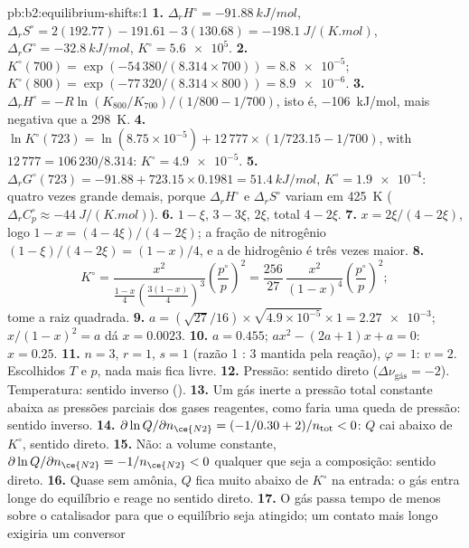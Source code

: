 \begin{solution}{pb:b2:equilibrium-shifts:1}
\textbf{1.} $\Delta_r H^\circ = \qty{-91.88}{kJ/mol}$, $\Delta_r S^\circ =
2(192.77) - 191.61 - 3(130.68) = \qty{-198.1}{J/(K.mol)}$, $\Delta_r G^\circ =
\qty{-32.8}{kJ/mol}$, $K^\circ = \num{5.6e5}$.
\textbf{2.} $K^\circ(700) = \exp(-54\,380/(8.314 \times 700)) = \num{8.8e-5}$;
$K^\circ(800) = \exp(-77\,320/(8.314 \times 800)) = \num{8.9e-6}$.
\textbf{3.} $\Delta_r H^\circ = -R\ln(K_{800}/K_{700})/(1/800 - 1/700)$,
isto é, \qty{-106}{kJ/mol}, mais negativa que a \qty{298}{K}.
\textbf{4.} $\ln K^\circ(723) = \ln(8.75 \times 10^{-5}) + 12\,777 \times
(1/723.15 - 1/700)$, with $12\,777 = 106\,230/8.314$: $K^\circ =
\num{4.9e-5}$.
\textbf{5.} $\Delta_r G^\circ(723) = -91.88 + 723.15 \times 0.1981 =
\qty{51.4}{kJ/mol}$, $K^\circ = \num{1.9e-4}$: quatro vezes grande demais, porque
$\Delta_r H^\circ$ e $\Delta_r S^\circ$ variam em \qty{425}{K}
($\Delta_r C_p^\circ \approx \qty{-44}{J/(K.mol)}$).
\textbf{6.}  $1 - \xi$,  $3 - 3\xi$,  $2\xi$, total $4 -
2\xi$.
\textbf{7.} $x = 2\xi/(4 - 2\xi)$, logo $1 - x = (4 - 4\xi)/(4 - 2\xi)$; a
fração de nitrogênio $(1 - \xi)/(4 - 2\xi) = (1 - x)/4$, e a de hidrogênio
é três vezes maior.
\textbf{8.}
\[
  K^\circ = \frac{x^2}{\frac{1-x}{4}\left(\frac{3(1-x)}{4}\right)^3}
  \left(\frac{p^\circ}{p}\right)^2 = \frac{256}{27}\,\frac{x^2}{(1 - x)^4}
  \left(\frac{p^\circ}{p}\right)^2 ;
\]
tome a raiz quadrada.
\textbf{9.} $a = (\sqrt{27}/16) \times \sqrt{4.9 \times 10^{-5}} \times 1 =
\num{2.27e-3}$; $x/(1 - x)^2 = a$ dá $x = 0.0023$.
\textbf{10.} $a = 0.455$; $ax^2 - (2a + 1)x + a = 0$: $x = 0.25$.
\textbf{11.} $n = 3$, $r = 1$, $s = 1$ (razão 1 : 3 mantida pela reação),
$\varphi = 1$: $v = 2$. Escolhidos $T$ e $p$, nada mais fica livre.
\textbf{12.} Pressão: sentido direto ($\Delta\nu_{\text{gás}} = -2$). Temperatura:
sentido inverso ().
\textbf{13.} Um gás inerte a pressão total constante abaixa as pressões
parciais dos gases reagentes, como faria uma queda de pressão: sentido inverso.
\textbf{14.} $\partial\ln Q/\partial n_{\ce{N2}} = (-1/0.30 + 2)/n_{\text{tot}} < 0$:
$Q$ cai abaixo de $K^\circ$, sentido direto.
\textbf{15.} Não: a volume constante, $\partial\ln Q/\partial n_{\ce{N2}} =
-1/n_{\ce{N2}} < 0$ qualquer que seja a composição: sentido direto.
\textbf{16.} Quase sem amônia, $Q$ fica muito abaixo de $K^\circ$ na entrada:
o gás entra longe do equilíbrio e reage no sentido direto.
\textbf{17.} O gás passa tempo de menos sobre o catalisador para que o
equilíbrio seja atingido; um contato mais longo exigiria um conversor

\end{solution}
